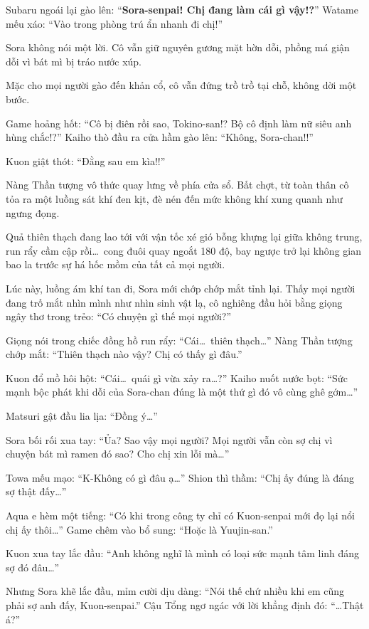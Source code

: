 \documentclass[../main.tex]{subfiles}
\begin{document}
Subaru ngoái lại gào lên: ``\textbf{Sora-senpai! Chị đang làm cái gì vậy!?}'' Watame mếu xáo: ``Vào trong phòng trú ẩn nhanh đi chị!''

Sora không nói một lời. Cô vẫn giữ nguyên gương mặt hờn dỗi, phồng má giận dỗi vì bát mì bị tráo nước xúp.

Mặc cho mọi người gào đến khản cổ, cô vẫn đứng trồ trồ tại chỗ, không dời một bước.

Game hoảng hốt: ``Cô bị điên rồi sao, Tokino-san!? Bộ cô định làm nữ siêu anh hùng chắc!?'' Kaiho thò đầu ra cửa hầm gào lên: ``Không, Sora-chan!!''

Kuon giật thót: ``Đằng sau em kìa!!''

Nàng Thần tượng vô thức quay lưng về phía cửa sổ. Bất chợt, từ toàn thân cô tỏa ra một luồng sát khí đen kịt, đè nén đến mức không khí xung quanh như ngưng đọng.

Quả thiên thạch đang lao tới với vận tốc xé gió bỗng khựng lại giữa không trung, run rẩy cầm cập rồi\dots\ cong đuôi quay ngoắt 180 độ, bay ngược trở lại không gian bao la trước sự há hốc mồm của tất cả mọi người.

Lúc này, luồng ám khí tan đi, Sora mới chớp chớp mắt tỉnh lại. Thấy mọi người đang trố mắt nhìn mình như nhìn sinh vật lạ, cô nghiêng đầu hỏi bằng giọng ngây thơ trong trẻo: ``Có chuyện gì thế mọi người?''

Giọng nói trong chiếc đồng hồ run rẩy: ``Cái\dots\ thiên thạch\dots'' Nàng Thần tượng chớp mắt: ``Thiên thạch nào vậy? Chị có thấy gì đâu.''

Kuon đổ mồ hôi hột: ``Cái\dots\ quái gì vừa xảy ra\dots?'' Kaiho nuốt nước bọt: ``Sức mạnh bộc phát khi dỗi của Sora-chan đúng là một thứ gì đó vô cùng ghê gớm\dots''

Matsuri gật đầu lia lịa: ``Đồng ý\dots''

Sora bối rối xua tay: ``Ủa? Sao vậy mọi người? Mọi người vẫn còn sợ chị vì chuyện bát mì ramen đó sao? Cho chị xin lỗi mà\dots''

Towa mếu mạo: ``K-Không có gì đâu ạ\dots'' Shion thì thầm: ``Chị ấy đúng là đáng sợ thật đấy\dots''

Aqua e hèm một tiếng: ``Có khi trong công ty chỉ có Kuon-senpai mới đọ lại nổi chị ấy thôi\dots'' Game chêm vào bổ sung: ``Hoặc là Yuujin-san.''

Kuon xua tay lắc đầu: ``Anh không nghĩ là mình có loại sức mạnh tâm linh đáng sợ đó đâu\dots''

Nhưng Sora khẽ lắc đầu, mỉm cười dịu dàng: ``Nói thế chứ nhiều khi em cũng phải sợ anh đấy, Kuon-senpai.'' Cậu Tổng ngơ ngác với lời khẳng định đó: ``\dots Thật á?''
\end{document}
